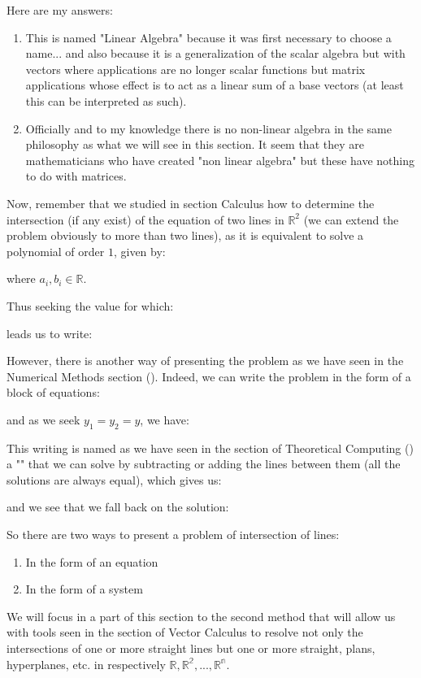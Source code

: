 	Here are my answers:

	\begin{enumerate}
		\item This is named "Linear Algebra" because it was first necessary to choose a name... and also because it is a generalization of the scalar algebra but with vectors where applications are no longer scalar functions but matrix applications whose effect is to act as a linear sum of a base vectors (at least this can be interpreted as such).
		\item Officially and to my knowledge there is no non-linear algebra in the same philosophy as what we will see in this section. It seem that they are mathematicians who have created "non linear algebra" but these have nothing to do with matrices.
	\end{enumerate}

Now, remember that we studied in section Calculus how to determine the intersection (if any exist) of the equation of two lines in $\mathbb{R}^2$  (we can extend the problem obviously to more than two lines), as it is equivalent to solve a polynomial of order $1$, given by:
	
where $a_i,b_i \in \mathbb{R}$.

Thus seeking the value for which:
	
leads us to write:
	
However, there is another way of presenting the problem as we have seen in the Numerical Methods section (). Indeed, we can write the problem in the form of a block of equations:
		
and as we seek $y_1=y_2=y$, we have:
		
This writing is named as we have seen in the section of Theoretical Computing () a "" that we can solve by subtracting or adding the lines between them (all the solutions are always equal), which gives us:
	
and we see that we fall back on the solution:
	
So there are two ways to present a problem of intersection of lines:
	\begin{enumerate}
		\item In the form of an equation
		\item In the form of a system
	\end{enumerate}
We will focus in a part of this section to the second method that will allow us with tools seen in the section of Vector Calculus to resolve not only the intersections of one or more straight lines but one or more straight, plans, hyperplanes, etc. in respectively $\mathbb{R},\mathbb{R^2},...,\mathbb{R^n}$. 

